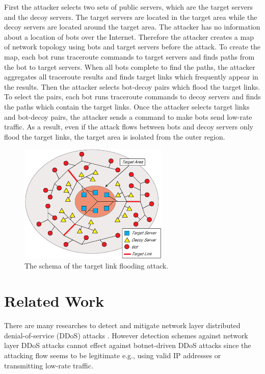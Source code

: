 \documentclass[conference]{IEEEtran}
\begin{document}
    First the attacker selects two sets of public servers, which are the target servers and the decoy servers.
    The target servers are located in the target area while the decoy servers are located around the target area.
    The attacker has no information about a location of bots over the Internet.
    Therefore the attacker creates a map of network topology using bots and target servers before the attack.
    To create the map, each bot runs traceroute commands to target servers and finds paths from the bot to target servers.
    When all bots complete to find the paths, the attacker aggregates all traceroute results and finds target links which frequently appear in the results.
    Then the attacker selects bot-decoy pairs which flood the target links.
    To select the pairs, each bot runs traceroute commands to decoy servers and finds the paths which contain the target links.
    Once the attacker selects target links and bot-decoy pairs, the attacker sends a command to make bots send low-rate traffic.
    As a result, even if the attack flows between bots and decoy servers only flood the target links, the target area is isolated from the outer region.
    \begin{figure}[!t]
      \centering
      \includegraphics[clip, width=2.8in]{./image/Elements.eps}
      \caption{The schema of the target link flooding attack.}
      \label{The schema of the target link flooding attack}
    \end{figure}

  \section{Related Work}\label{Sec:Related Work}
    There are many researches to detect and mitigate network layer distributed denial-of-service (DDoS) attacks \cite{ddossurvey01, ddossurvey02}.
    However detection schemes against network layer DDoS attacks cannot effect against botnet-driven DDoS attacks since the attacking flow seems to be legitimate e.g., using valid IP addresses or transmitting low-rate traffic.
\end{document}

